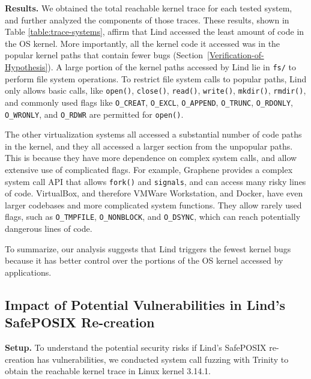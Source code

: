 {{{\noindent
\textbf{Results.}
We obtained the total reachable kernel trace for
each tested system,
and further analyzed the components of those traces. These results,
shown in Table \ref{table:trace-systems}, affirm that Lind accessed the
least amount of code in the OS
kernel. More importantly, all the kernel code it accessed was in the
popular kernel paths that contain fewer bugs (Section~{\ref{Verification-of-Hypothesis}}).
A large portion of the kernel paths accessed by Lind lie in
\texttt{fs/} to perform file system operations.
To restrict file system calls to popular paths, Lind only allows basic calls,
like \texttt{open()}, \texttt{close()}, \texttt{read()}, \texttt{write()}, \texttt{mkdir()},
\texttt{rmdir()}, and commonly used flags like \texttt{O\_CREAT}, \texttt{O\_EXCL},
 \texttt{O\_APPEND}, \texttt{O\_TRUNC},
\texttt{O\_RDONLY}, \texttt{O\_WRONLY}, and \texttt{O\_RDWR} are
permitted for \texttt{open()}.

The other virtualization systems all accessed a substantial number of code
paths in the kernel,
and they all accessed a larger section from the unpopular paths.
This is because they have
more dependence on complex system calls, and
allow extensive use of complicated flags. For example,
Graphene provides a complex system call API that allows
\texttt{fork()} and \texttt{signals}, and can access many risky lines of code.
VirtualBox, and therefore VMWare Workstation, and Docker, have even larger
codebases and more complicated system functions. They allow
rarely used flags, such as \texttt{O\_TMPFILE}, \texttt{O\_NONBLOCK},
and \texttt{O\_DSYNC}, which can reach potentially dangerous lines
of code.

To summarize, our analysis suggests that Lind triggers the fewest kernel bugs because
it has better control over the portions of the OS kernel accessed by applications.

\subsection{Impact of Potential Vulnerabilities in Lind's SafePOSIX Re-creation}
\label{Reachable-Kernel-Trace-Analysis-for-Repy-Sandbox}


\noindent
\textbf{Setup.}
To understand the potential security risks if Lind's SafePOSIX re-creation
has vulnerabilities, we conducted system call fuzzing with Trinity
to obtain the reachable kernel trace in Linux kernel 3.14.1.

}}}
